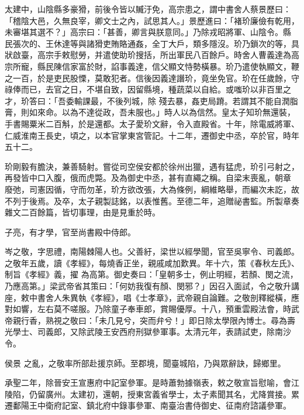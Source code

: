 \begin{pinyinscope}
 太建中，山陰縣多豪猾，前後令皆以贓汙免，高宗患之，謂中書舍人蔡景歷曰：「稽陰大邑，久無良宰，卿文士之內，試思其人。」景歷進曰：「褚玠廉儉有乾用，未審堪其選不？」高宗曰：「甚善，卿言與朕意同。」乃除戎昭將軍、山陰令。縣
 民張次的、王休達等與諸猾吏賄賂通姦，全丁大戶，類多隱沒。玠乃鎖次的等，具狀啟臺，高宗手敕慰勞，并遣使助玠搜括，所出軍民八百餘戶。時舍人曹義達為高宗所寵，縣民陳信家富於財，諂事義達，信父顯文恃勢橫暴。玠乃遣使執顯文，鞭之一百，於是吏民股慄，莫敢犯者。信後因義達譖玠，竟坐免官。玠在任歲餘，守祿俸而已，去官之日，不堪自致，因留縣境，種蔬菜以自給。或嗤玠以非百里之才，玠答曰：「吾委輸課最，不後列城，除
 殘去暴，姦吏局蹐。若謂其不能自潤脂膏，則如來命。以為不達從政，吾未服也。」時人以為信然。皇太子知玠無還裝，手書賜粟米二百斛，於是還都。太子愛玠文辭，令入直殿省。十年，除電威將軍、仁威淮南王長史，頃之，以本官掌東宮管記。十二年，遷御史中丞，卒於官，時年五十二。



 玠剛毅有膽決，兼善騎射。嘗從司空侯安都於徐州出獵，遇有猛虎，玠引弓射之，再發皆中口入腹，俄而虎斃。及為御史中丞，甚有直繩之稱。自梁末喪亂，朝章
 廢弛，司憲因循，守而勿革，玠方欲改張，大為條例，綱維略舉，而編次未訖，故不列于後焉。及卒，太子親製誌銘，以表惟舊。至德二年，追贈祕書監。所製章奏雜文二百餘篇，皆切事理，由是見重於時。



 子亮，有才學，官至尚書殿中侍郎。



 岑之敬，字思禮，南陽棘陽人也。父善紆，梁世以經學聞，官至吳寧令、司義郎。之敬年五歲，讀《孝經》，每燒香正坐，親戚咸加歎異。年十六，策《春秋左氏》、制旨《孝經》義，擢
 為高第。御史奏曰：「皇朝多士，例止明經，若顏、閔之流，乃應高第。」梁武帝省其策曰：「何妨我復有顏、閔邪？」因召入面試，令之敬升講座，敕中書舍人朱異執《孝經》，唱《士孝章》，武帝親自論難。之敬剖釋縱橫，應對如響，左右莫不嗟服。乃除童子奉車郎，賞賜優厚。十八，預重雲殿法會，時武帝親行香，熟視之敬曰：「未几見兮，突而弁兮！」即日除太學限內博士。尋為壽光學士、司義郎，又除武陵王安西府刑獄參軍事。太清元年，表請試吏，除南沙令。



 侯景
 之亂，之敬率所部赴援京師。至郡境，聞臺城陷，乃與眾辭訣，歸鄉里。



 承聖二年，除晉安王宣惠府中記室參軍。是時蕭勃據嶺表，敕之敬宣旨慰喻，會江陵陷，仍留廣州。太建初，還朝，授東宮義省學士，太子素聞其名，尤降賞接。累遷鄱陽王中衛府記室、鎮北府中錄事參軍、南臺治書侍御史、征南府諮議參軍。




\end{pinyinscope}
